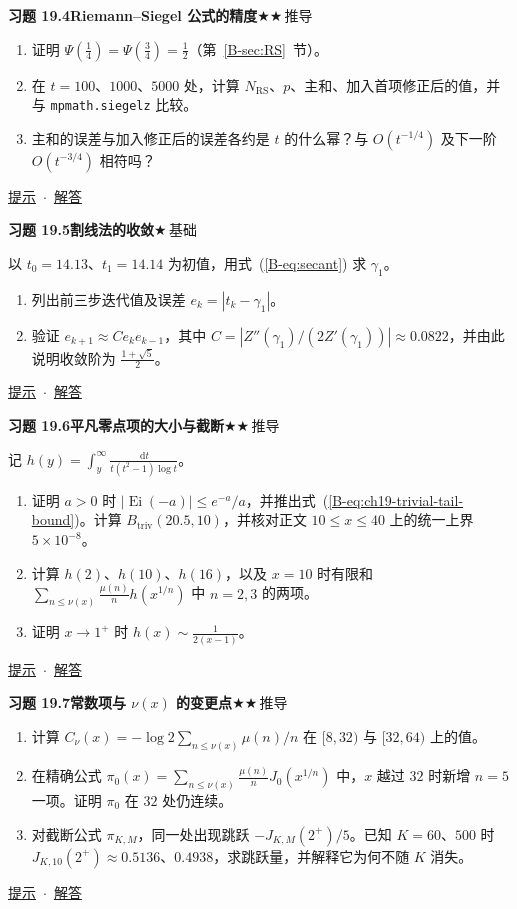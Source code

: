 \documentclass[11pt,a4paper]{article}
\DeclareMathOperator{\Ei}{Ei}
\newcommand{\dd}{\,\mathrm{d}}
\newcommand{\bref}[1]{\ref*{B-#1}}
\newcommand{\lvI}{$\bigstar$\,基础}
\newcommand{\lvII}{$\bigstar\bigstar$\,推导}
\newcommand{\Q}[3]{%
  \par\addvspace{1.1em}\noindent
  \hypertarget{q:#1}{}\textbf{习题 #1}\quad\textbf{#3}\hfill{\small #2}\par
  \nopagebreak\smallskip}
\newcommand{\toHint}[1]{\hfill{\small\hyperlink{h:#1}{提示}\ $\cdot$\ \hyperlink{s:#1}{解答}}}
\begin{document}
\Q{19.4}{\lvII}{Riemann--Siegel 公式的精度}
\begin{enumerate}
  \item 证明 $\Psi(\frac14)=\Psi(\frac34)=\frac12$（第~\bref{sec:RS}~节）。
  \item 在 $t=100$、$1000$、$5000$ 处，计算 $N_{\mathrm{RS}}$、$p$、主和、加入首项修正后的值，并与 \texttt{mpmath.siegelz} 比较。
  \item 主和的误差与加入修正后的误差各约是 $t$ 的什么幂？与 $O(t^{-1/4})$ 及下一阶 $O(t^{-3/4})$ 相符吗？
\end{enumerate}
\toHint{19.4}

\Q{19.5}{\lvI}{割线法的收敛}
以 $t_0=14.13$、$t_1=14.14$ 为初值，用式~(\bref{eq:secant}) 求 $\gamma_1$。
\begin{enumerate}
  \item 列出前三步迭代值及误差 $e_k=|t_k-\gamma_1|$。
  \item 验证 $e_{k+1}\approx Ce_ke_{k-1}$，其中 $C=|Z''(\gamma_1)/(2Z'(\gamma_1))|\approx0.0822$，并由此说明收敛阶为 $\frac{1+\sqrt5}2$。
\end{enumerate}
\toHint{19.5}

\Q{19.6}{\lvII}{平凡零点项的大小与截断}
记 $h(y)=\int_y^\infty\frac{\dd t}{t(t^2-1)\log t}$。
\begin{enumerate}
  \item 证明 $a>0$ 时 $|\Ei(-a)|\le e^{-a}/a$，并推出式~(\bref{eq:ch19-trivial-tail-bound})。计算 $B_{\mathrm{triv}}(20.5,10)$，并核对正文 $10\le x\le40$ 上的统一上界 $5\times10^{-8}$。
  \item 计算 $h(2)$、$h(10)$、$h(16)$，以及 $x=10$ 时有限和 $\sum_{n\le\nu(x)}\frac{\mu(n)}nh(x^{1/n})$ 中 $n=2,3$ 的两项。
  \item 证明 $x\to1^+$ 时 $h(x)\sim\frac1{2(x-1)}$。
\end{enumerate}
\toHint{19.6}

\Q{19.7}{\lvII}{常数项与 $\nu(x)$ 的变更点}
\begin{enumerate}
  \item 计算 $C_\nu(x)=-\log2\sum_{n\le\nu(x)}\mu(n)/n$ 在 $[8,32)$ 与 $[32,64)$ 上的值。
  \item 在精确公式 $\pi_0(x)=\sum_{n\le\nu(x)}\frac{\mu(n)}nJ_0(x^{1/n})$ 中，$x$ 越过 $32$ 时新增 $n=5$ 一项。证明 $\pi_0$ 在 $32$ 处仍连续。
  \item 对截断公式 $\pi_{K,M}$，同一处出现跳跃 $-J_{K,M}(2^+)/5$。已知 $K=60$、$500$ 时 $J_{K,10}(2^+)\approx0.5136$、$0.4938$，求跳跃量，并解释它为何不随 $K$ 消失。
\end{enumerate}
\toHint{19.7}
\end{document}
